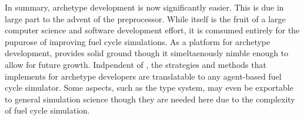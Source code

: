 In summary, archetype development is now significantly easier. This is due in large
part to the advent of the \cyclus preprocessor. While \cycpp itself is the fruit of
a large computer science and software development effort, it is comsumed entirely 
for the pupurose of improving fuel cycle simulations. As a platform for archetype
development, \cyclus provides solid ground though it simeltaenously nimble enough
to allow for future growth. Indpendent of \cyclus, the strategies and methods that
\cyclus implements for archetype developers are translatable to any agent-based 
fuel cycle simulator.  Some aspects, such as the type system,  may even be exportable 
to general simulation science though they are needed here due to the complexity of 
fuel cycle simulation.

